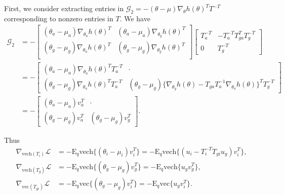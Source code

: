 \documentclass{statsoc}
\newcommand\E{{\text{E}}}
\newcommand\mL{{\mathcal{L}}}
\newcommand\G{{\mathcal{G}}}
\newcommand{\vc}{\text{vec}}
\newcommand{\vech}{\text{vech}}
\begin{document}
First, we consider extracting entries in $\G_2 = - (\theta - \mu)  \nabla_\theta h(\theta)^T T^{-T}$ corresponding to nonzero entries in $T$. We have
\[
\begin{aligned}
\G_2 &= - \begin{bmatrix}
(\theta_a - \mu_a) \nabla_{\theta_a} h(\theta)^T &  (\theta_a - \mu_a) \nabla_{\theta_g} h(\theta)^T \\
(\theta_g - \mu_g) \nabla_{\theta_a} h(\theta)^T &  (\theta_g - \mu_g) \nabla_{\theta_g} h(\theta)^T \\
\end{bmatrix}
\begin{bmatrix} T_a^{-T} &  - T_a^{-T} T_{ga}^T  T_g^{-T} \\ 0 & T_g^{-T} \end{bmatrix}
\\
&= - \begin{bmatrix}
(\theta_a - \mu_a) \nabla_{\theta_a} h(\theta)^T T_a^{-T} & \cdot \\
(\theta_g - \mu_g) \nabla_{\theta_a} h(\theta)^T  T_a^{-T} &  (\theta_g - \mu_g) \{\nabla_{\theta_g} h(\theta) -  T_{ga} T_a^{-1} \nabla_{\theta_a} h(\theta) \}^T   T_g^{-T}
\end{bmatrix} \\
&= - \begin{bmatrix} (\theta_a - \mu_a) v_a^T & \cdot \\
(\theta_g - \mu_g) v_a^T &  (\theta_g - \mu_g) v_g^T \end{bmatrix}.
\end{aligned} 
\]

Thus
\[
\begin{aligned}
\nabla_{\vech(T_i)} \mL &=- \E_q \vech \{ (\theta_i - \mu_i)  v_i^T\} 
=- \E_q \vech \{ (u_i - T_i^{-T} T_{gi} u_g)  v_i^T\} , \\
\nabla_{\vech(T_g)} \mL & = -\E_q \vech \{ (\theta_g - \mu_g) v_g^T \} 
= -\E_q \vech \{ u_g v_g^T \}, \\
\nabla_{\vc(T_{gi})} \mL &= -\E_q \vc\{  (\theta_g - \mu_g) v_i^T \} 
= -\E_q \vc\{  u_g v_i^T \}.
\end{aligned}
\]
\end{document}

